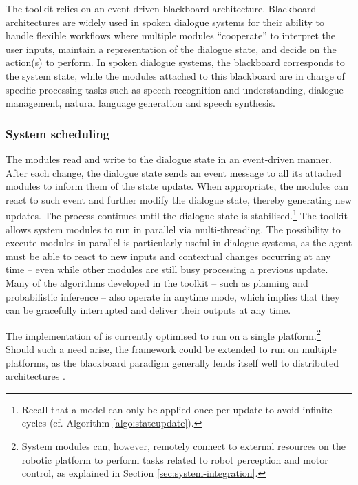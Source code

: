The \opendial{} toolkit relies on an event-driven blackboard architecture. Blackboard architectures are widely used in spoken dialogue systems for their ability to handle flexible workflows where multiple modules ``cooperate'' to  interpret the user inputs, maintain a representation of the dialogue state, and decide on the action(s) to perform. In spoken dialogue systems, the blackboard corresponds to the system state, while the modules attached to this blackboard are in charge of specific processing tasks such as speech recognition and understanding, dialogue management, natural language generation and speech synthesis. 


\subsubsection*{System scheduling}

The modules read and write to the dialogue state in an event-driven manner. After each change, the dialogue state sends an event message to all its attached modules to inform them of the state update. When appropriate, the modules can react to such event and further modify the dialogue state, thereby generating new updates. The process continues until the dialogue state is stabilised.\footnote{Recall that a model can only be applied once per update to avoid infinite cycles (cf. Algorithm \ref{algo:stateupdate}).}   The \opendial{} toolkit allows system modules to run in parallel via multi-threading. The possibility to execute modules in parallel is particularly useful in dialogue systems, as the agent must be able to react to new inputs and contextual changes occurring at any time -- even while other modules are still busy processing a previous update.  Many of the algorithms developed in the toolkit -- such as planning and probabilistic inference -- also operate in anytime mode, which implies that they can be gracefully interrupted and deliver their outputs at any time.

The implementation of \opendial{} is currently optimised to run on a single platform.\footnote{System modules can, however, remotely connect to external resources on the robotic platform to perform tasks related to robot perception and motor control, as explained in Section \ref{sec:system-integration}.} Should such a need arise, the framework could be extended to run on multiple platforms, as the blackboard paradigm generally lends itself well to distributed architectures \citep{Corkill:1988}.

